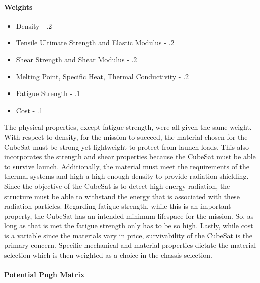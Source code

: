 \paragraph{Weights}
\begin{itemize}
    \item Density - .2
    \item Tensile Ultimate Strength and Elastic Modulus - .2
    \item Shear Strength and Shear Modulus - .2
    \item Melting Point, Specific Heat, Thermal Conductivity - .2
    \item Fatigue Strength - .1
    \item Cost - .1
\end{itemize}
\bigskip
The physical properties, except fatigue strength, were all given the same weight. With respect to density, for the mission to succeed, the material chosen for the CubeSat must be strong yet lightweight to protect from launch loads. This also incorporates the strength and shear properties because the CubeSat must be able to survive launch. Additionally, the material must meet the requirements of the thermal systems and high a high enough density to provide radiation shielding. Since the objective of the CubeSat is to detect high energy radiation, the structure must be able to withstand the energy that is associated with these radiation particles. 
\bigskip
Regarding fatigue strength, while this is an important property, the CubeSat has an intended minimum lifespace for the mission. So, as long as that is met the fatigue strength only has to be so high. Lastly, while cost is a variable since the materials vary in price, survivability of the CubeSat is the primary concern. Specific mechanical and material properties dictate the material selection which is then weighted as a choice in the chassis selection.

\paragraph{Potential Pugh Matrix} ~\\~\\

